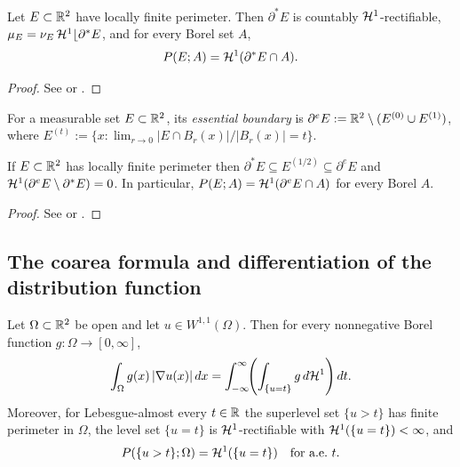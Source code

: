 \begin{theorem}\label{thm:de-giorgi}
Let $E\subset\mathbb{R}^2$ have locally finite perimeter.  Then $\partial^*E$ is
countably $\mathcal{H}^1$-rectifiable, $\mu_E = \nu_E\,\mathcal{H}^1\lfloor\partial^*E$, and
for every Borel set $A$,
\[
  P(E;A) = \mathcal{H}^1(\partial^*E\cap A).
\]
\end{theorem}

\begin{proof}
See \cite[Theorem~15.9, Corollary~16.1]{Maggi2012} or
\cite[Section~5.7, Theorem~5.15]{EvansGariepy2015}.
\end{proof}

\begin{definition}\label{def:essential-boundary}
For a measurable set $E\subset\mathbb{R}^2$, its \emph{essential boundary} is
$\partial^e E := \mathbb{R}^2\setminus(E^{(0)}\cup E^{(1)})$, where
$E^{(t)}:=\{x:\lim_{r\to0}|E\cap B_r(x)|/|B_r(x)|=t\}$.
\end{definition}

\begin{theorem}[Federer]\label{thm:federer}
If $E\subset\mathbb{R}^2$ has locally finite perimeter then
$\partial^*E\subseteq E^{(1/2)}\subseteq\partial^e E$ and
$\mathcal{H}^1(\partial^e E\setminus\partial^*E)=0$.  In particular,
$P(E;A)=\mathcal{H}^1(\partial^e E\cap A)$ for every Borel $A$.
\end{theorem}

\begin{proof}
See \cite[Theorem~15.5, Theorem~16.2]{Maggi2012} or
\cite[Theorem~5.16]{EvansGariepy2015}.
\end{proof}

\subsection{The coarea formula and differentiation of the distribution
function}

\begin{theorem}\label{thm:coarea}
Let $\Omega\subset\mathbb{R}^2$ be open and let $u\in W^{1,1}(\Omega)$.  Then for
every nonnegative Borel function $g:\Omega\to[0,\infty]$,
\begin{equation}\label{eq:coarea-formula}
  \int_\Omega g(x)\,|\nabla u(x)|\,dx
  = \int_{-\infty}^{\infty}\!\!\left(\int_{\{u=t\}} g\,d\mathcal{H}^1\right)dt.
\end{equation}
Moreover, for Lebesgue-almost every $t\in\mathbb{R}$ the superlevel set $\{u>t\}$ has
finite perimeter in $\Omega$, the level set $\{u=t\}$ is $\mathcal{H}^1$-rectifiable
with $\mathcal{H}^1(\{u=t\})<\infty$, and
\[
  P(\{u>t\};\Omega) = \mathcal{H}^1(\{u=t\}) \quad\text{for a.e.\ } t.
\]
\end{theorem}

